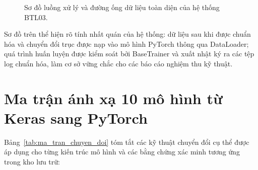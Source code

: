 \begin{figure}[H]
\centering
{}
\caption{Sơ đồ luồng xử lý và đường ống dữ liệu toàn diện của hệ thống BTL03.}
\label{fig:t0402-pipeline}
\end{figure}

Sơ đồ trên thể hiện rõ tính nhất quán của hệ thống: dữ liệu sau khi được chuẩn hóa và chuyển đổi trục được nạp vào mô hình PyTorch thông qua DataLoader; quá trình huấn luyện được kiểm soát bởi BaseTrainer và xuất nhật ký ra các tệp log chuẩn hóa, làm cơ sở vững chắc cho các báo cáo nghiệm thu kỹ thuật.

\section{Ma trận ánh xạ 10 mô hình từ Keras sang PyTorch}
Bảng~\ref{tab:ma_tran_chuyen_doi} tóm tắt các kỹ thuật chuyển đổi cụ thể được áp dụng cho từng kiến trúc mô hình và các bằng chứng xác minh tương ứng trong kho lưu trữ:

